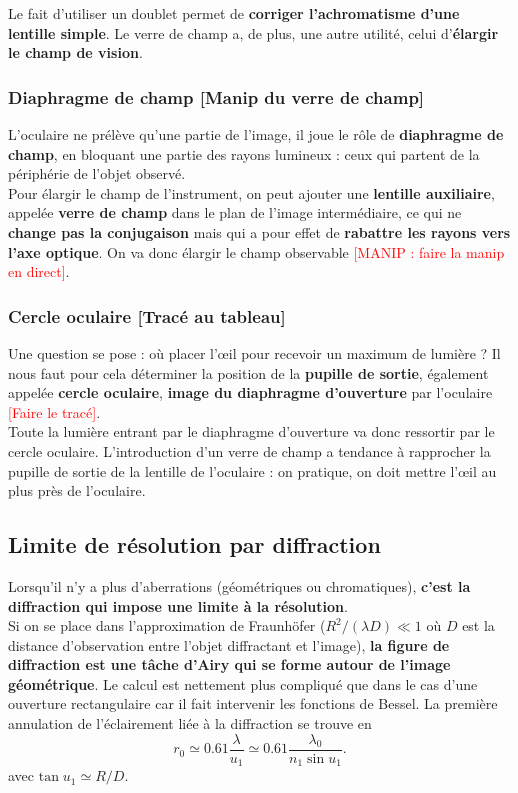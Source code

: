 \documentclass[11pt,a4paper]{report}
\begin{document}
Le fait d'utiliser un doublet permet de \textbf{corriger l'achromatisme d'une lentille simple}. Le verre de champ a, de plus, une autre utilité, celui d'\textbf{élargir le champ de vision}.

\subsubsection{Diaphragme de champ [Manip du verre de champ]}

L'oculaire ne prélève qu'une partie de l'image, il joue le rôle de \textbf{diaphragme de champ}, en bloquant une partie des rayons lumineux : ceux qui partent de la périphérie de l'objet observé.\\

Pour élargir le champ de l'instrument, on peut ajouter une \textbf{lentille auxiliaire}, appelée \textbf{verre de champ} dans le plan de l'image intermédiaire, ce qui ne \textbf{change pas la conjugaison} mais qui a pour effet de \textbf{rabattre les rayons vers l'axe optique}. On va donc élargir le champ observable \textcolor{red}{[MANIP : faire la manip en direct]}.

\subsubsection{Cercle oculaire [Tracé au tableau]}

Une question se pose : où placer l'œil pour recevoir un maximum de lumière ? Il nous faut pour cela déterminer la position de la \textbf{pupille de sortie}, également appelée \textbf{cercle oculaire}, \textbf{image du diaphragme d'ouverture} par l'oculaire \textcolor{red}{[Faire le tracé]}.\\

Toute la lumière entrant par le diaphragme d'ouverture va donc ressortir par le cercle oculaire. L'introduction d'un verre de champ a tendance à rapprocher la pupille de sortie de la lentille de l'oculaire : on pratique, on doit mettre l'œil au plus près de l'oculaire.

\subsection{Limite de résolution par diffraction}

Lorsqu'il n'y a plus d'aberrations (géométriques ou chromatiques), \textbf{c'est la diffraction qui impose une limite à la résolution}.\\

Si on se place dans l'approximation de Fraunhöfer ($R^2/(\lambda D) \ll 1$ où $D$ est la distance d'observation entre l'objet diffractant et l'image), \textbf{la figure de diffraction est une tâche d'Airy qui se forme autour de l'image géométrique}. Le calcul est nettement plus compliqué que dans le cas d'une ouverture rectangulaire car il fait intervenir les fonctions de Bessel. La première annulation de l'éclairement liée à la diffraction se trouve en 
\begin{equation}
	\boxed{r_0 \simeq 0.61 \frac{\lambda}{u_1} \simeq 0.61 \frac{\lambda_0}{n_1\;\text{sin}\;u_1}}.
\end{equation}
avec $\text{tan}\; u_1 \simeq R/D$.
\end{document}
